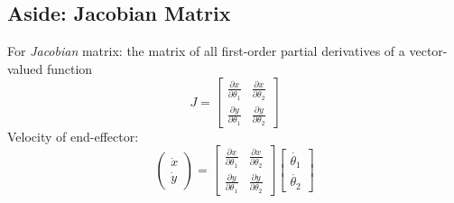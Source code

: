 \documentclass[10pt]{article}
\begin{document}
\subsection*{Aside: Jacobian Matrix}
For \textit{Jacobian} matrix: the matrix of all first-order partial derivatives of a vector-valued function
\[J = \begin{bmatrix} \frac{\partial x}{\partial \theta_1} & \frac{\partial x}{\partial \theta_2} \\ \frac{\partial y}{\partial \theta_1} & \frac{\partial y}{\partial \theta_2} \end{bmatrix}\]
Velocity of end-effector:
\[\begin{pmatrix} \dot{x} \\ \dot{y} \end{pmatrix} = \begin{bmatrix} \frac{\partial x}{\partial \theta_1} & \frac{\partial x}{\partial \theta_2} \\ \frac{\partial y}{\partial \theta_1} & \frac{\partial y}{\partial \theta_2} \end{bmatrix} \begin{bmatrix} \dot{\theta_1} \\ \dot{\theta_2} \end{bmatrix}\]
\end{document}
